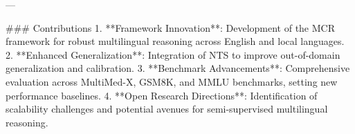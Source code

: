 ---

### Contributions
1. **Framework Innovation**: Development of the MCR framework for robust multilingual reasoning across English and local languages.
2. **Enhanced Generalization**: Integration of NTS to improve out-of-domain generalization and calibration.
3. **Benchmark Advancements**: Comprehensive evaluation across MultiMed-X, GSM8K, and MMLU benchmarks, setting new performance baselines.
4. **Open Research Directions**: Identification of scalability challenges and potential avenues for semi-supervised multilingual reasoning.


